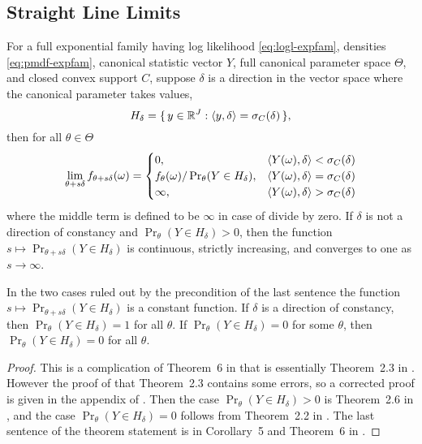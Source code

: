 \subsection{Straight Line Limits}

\begin{theorem} \label{th:completion-fundamental}
For a full exponential family having log likelihood \eqref{eq:logl-expfam},
densities \eqref{eq:pmdf-expfam}, canonical statistic vector $Y$,
full canonical parameter space $\Theta$, and closed convex support $C$,
suppose $\delta$ is a direction in the vector space where the canonical
parameter takes values,
\begin{equation} \label{eq:complete-fundamental-hyperplane}
   H_\delta = \{\,  y \in \mathbb{R}^J : \langle y, \delta \rangle = \sigma_C(\delta)  \,\},
\end{equation}
then for all $\theta \in \Theta$
\begin{equation} \label{eq:complete-fundamental-limit}
   \lim_{\theta + s \delta} f_{\theta + s \delta}(\omega)
   =
   \begin{cases}
   0, & \langle Y(\omega), \delta \rangle < \sigma_C(\delta)
   \\
   f_\theta(\omega) / \Pr_\theta(Y \in H_\delta),
   & \langle Y(\omega), \delta \rangle = \sigma_C(\delta)
   \\
   \infty, & \langle Y(\omega), \delta \rangle > \sigma_C(\delta)
   \end{cases}
\end{equation}
where the middle term is defined to be $\infty$ in case of divide by zero.
If $\delta$ is not a direction of constancy
and $\Pr_\theta(Y \in H_\delta) > 0$, then the function
$s \mapsto \Pr_{\theta + s \delta}(Y \in H_\delta)$ is continuous,
strictly increasing, and converges to one
as $s \to \infty$.
\end{theorem}
In the two cases ruled out by the precondition of the last sentence
the function $s \mapsto \Pr_{\theta + s \delta}(Y \in H_\delta)$ is
a constant function.  If $\delta$ is a direction of constancy,
then $\Pr_\theta(Y \in H_\delta) = 1$ for all $\theta$.
If $\Pr_\theta(Y \in H_\delta) = 0$ for some $\theta$,
then $\Pr_\theta(Y \in H_\delta) = 0$ for all $\theta$.
\begin{proof}
This is a complication of Theorem~{6} in \citet{geyer-gdor}
that is essentially Theorem~{2.3} in \citet{geyer-thesis}.
However the proof of that Theorem~{2.3} contains some errors,
so a corrected proof is given in the appendix of \citet{geyer-gdor}.
Then the case $\Pr_\theta(Y \in H_\delta) > 0$ is Theorem~{2.6}
in \citet{geyer-thesis},
and the case $\Pr_\theta(Y \in H_\delta) = 0$ follows from Theorem~{2.2}
in \citet{geyer-thesis}.
The last sentence of the theorem statement is in Corollary~{5} and Theorem~{6}
in \citet{geyer-gdor}.
\end{proof}
